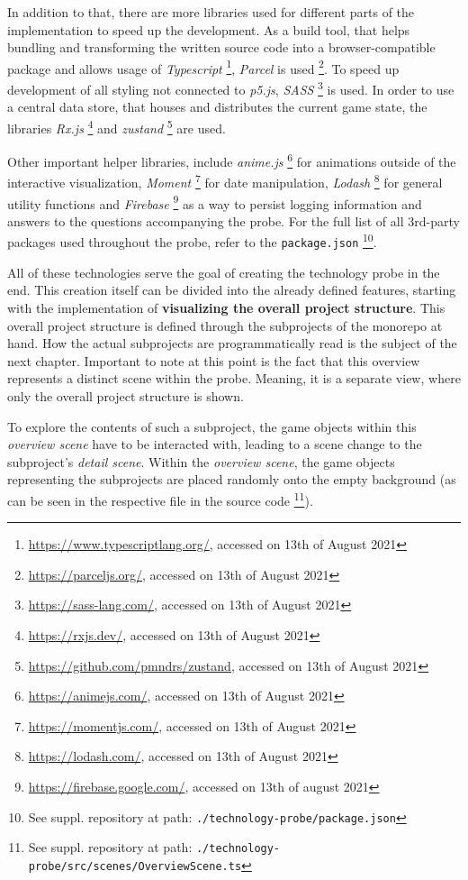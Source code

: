 In addition to that, there are more libraries used for different parts of the implementation to speed up the development. As a build tool, that helps bundling and transforming the written source code into a browser-compatible package and allows usage of \textit{Typescript} \footnote{\url{https://www.typescriptlang.org/}, accessed on 13th of August 2021}, \textit{Parcel} is used \footnote{\url{https://parceljs.org/}, accessed on 13th of August 2021}. To speed up development of all styling not connected to \textit{p5.js}, \textit{SASS} \footnote{\url{https://sass-lang.com/}, accessed on 13th of August 2021} is used. In order to use a central data store, that houses and distributes the current game state, the libraries \textit{Rx.js} \footnote{\url{https://rxjs.dev/}, accessed on 13th of August 2021} and \textit{zustand} \footnote{\url{https://github.com/pmndrs/zustand}, accessed on 13th of August 2021} are used.

Other important helper libraries, include \textit{anime.js} \footnote{\url{https://animejs.com/}, accessed on 13th of August 2021} for animations outside of the interactive visualization, \textit{Moment} \footnote{\url{https://momentjs.com/}, accessed on 13th of August 2021} for date manipulation, \textit{Lodash} \footnote{\url{https://lodash.com/}, accessed on 13th of August 2021} for general utility functions and \textit{Firebase} \footnote{\url{https://firebase.google.com/}, accessed on 13th of august 2021} as a way to persist logging information and answers to the questions accompanying the probe. For the full list of all 3rd-party packages used throughout the probe, refer to the \verb|package.json| \footnote{See suppl. repository at path: \texttt{./technology-probe/package.json}}.

All of these technologies serve the goal of creating the technology probe in the end. This creation itself can be divided into the already defined features, starting with the implementation of \textbf{visualizing the overall project structure}. This overall project structure is defined through the subprojects of the monorepo at hand. How the actual subprojects are programmatically read is the subject of the next chapter. Important to note at this point is the fact that this overview represents a distinct scene within the probe. Meaning, it is a separate view, where only the overall project structure is shown.

To explore the contents of such a subproject, the game objects within this \textit{overview scene} have to be interacted with, leading to a scene change to the subproject's \textit{detail scene}. Within the \textit{overview scene}, the game objects representing the subprojects are placed randomly onto the empty background (as can be seen in the respective file in the source code \footnote{See suppl. repository at path: \texttt{./technology-probe/src/scenes/OverviewScene.ts}}).

